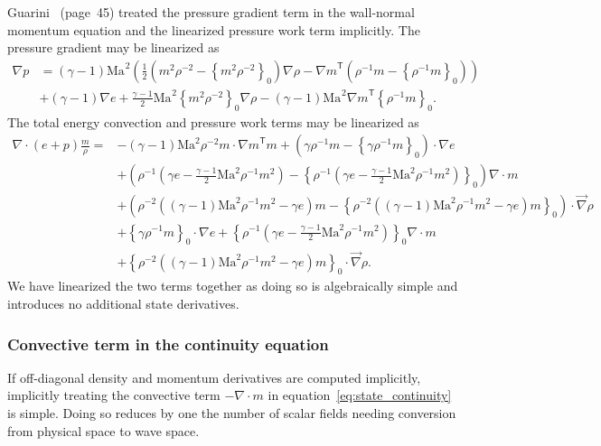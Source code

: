 \documentclass[letterpaper,11pt,nointlimits,reqno,draft]{amsart}
\newcommand{\trans}[1]{{#1}^{\ensuremath{\mathsf{T}}}}
\newcommand{\Mach}[1][]{\ensuremath{\mbox{Ma}_{#1}}}
\newcommand{\reference}[1]{\ensuremath{\left\{#1\right\}_{0}}}
\newcommand{\lessreference}[1]
  {\ensuremath{\left({#1}-\reference{#1}\right)}}
\begin{document}
Guarini~\cite{Guarini1998} (page~45) treated the pressure gradient term in the
wall-normal momentum equation and the linearized pressure work term implicitly.
The pressure gradient may be linearized as
\begin{align}
  \nabla{}p &= \left(\gamma-1\right)\Mach^{2}\left(
      \frac{1}{2} \lessreference{m^{2}\rho^{-2}}\nabla\rho
    - \trans{\nabla{}m}\lessreference{\rho^{-1}m}
  \right)
\\
&+ \left(\gamma-1\right) \nabla{}e
 + \frac{\gamma-1}{2}\Mach^{2} \reference{m^{2}\rho^{-2}}\nabla\rho
 - \left(\gamma-1\right)\Mach^{2} \trans{\nabla{}m}\reference{\rho^{-1}m}
 .
\end{align}
The total energy convection and pressure work terms may be linearized as
\begin{align}
\nabla\cdot\left(e+p\right)\frac{m}{\rho} =
   &- \left(\gamma-1\right)\mbox{Ma}^{2}\rho^{-2}m\cdot \trans{\nabla{}m}m
    + \lessreference{ \gamma\rho^{-1}m }\cdot\nabla{}e
  \\
   &+ \lessreference{\rho^{-1}\left(
        \gamma{}e - \frac{\gamma-1}{2}\mbox{Ma}^{2} \rho^{-1}m^2
      \right)} \nabla\cdot{}m
  \\
   &+ \lessreference{ \rho^{-2}\left(
        \left(\gamma-1\right) \mbox{Ma}^{2}\rho^{-1}m^2 - \gamma{}e
      \right)m}\cdot\vec{\nabla}\rho
  \\
   &+ \reference{ \gamma\rho^{-1}m }\cdot\nabla{}e
    + \reference{\rho^{-1}\left(
        \gamma{}e - \frac{\gamma-1}{2}\mbox{Ma}^{2} \rho^{-1}m^2
      \right)} \nabla\cdot{}m
  \\
   &+ \reference{ \rho^{-2}\left(
        \left(\gamma-1\right) \mbox{Ma}^{2}\rho^{-1}m^2 - \gamma{}e
      \right)m}\cdot\vec{\nabla}\rho
.
\end{align}
We have linearized the two terms together as doing so is algebraically simple
and introduces no additional state derivatives.

\subsubsection{Convective term in the continuity equation}
\label{sec:contconv}

If off-diagonal density and momentum derivatives are computed implicitly,
implicitly treating the convective term $-\nabla\cdot{}m$ in
equation~\eqref{eq:state_continuity} is simple.  Doing so reduces by one the
number of scalar fields needing conversion from physical space to wave space.
\end{document}
